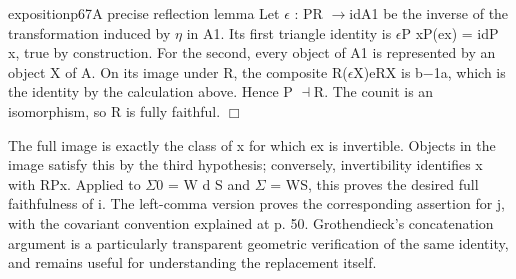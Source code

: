 \begin{dcomment}{exposition}{p67}{A precise reflection lemma}
Let \ensuremath{\epsilon} : PR \ensuremath{\to}idA1 be the inverse of the transformation induced by \ensuremath{\eta} in A1. Its first triangle identity is \ensuremath{\epsilon}P xP(ex) = idP x, true by construction. For the second, every object of A1 is represented by an object X of A. On its image under R, the composite R(\ensuremath{\epsilon}X)eRX is b\ensuremath{-}1a, which is the identity by the calculation above. Hence P \ensuremath{\dashv}R. The counit is an isomorphism, so R is fully faithful. \ensuremath{\Box}

The full image is exactly the class of x for which ex is invertible. Objects in the image satisfy this by the third hypothesis; conversely, invertibility identifies x with RPx. Applied to \ensuremath{\Sigma}0 = W d S and \ensuremath{\Sigma} = WS, this proves the desired full faithfulness of i. The left-comma version proves the corresponding assertion for j, with the covariant convention explained at p. 50. Grothendieck’s concatenation argument is a particularly transparent geometric verification of the same identity, and remains useful for understanding the replacement itself.

\end{dcomment}

